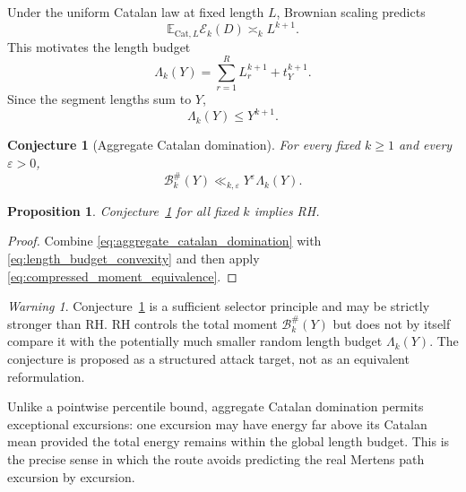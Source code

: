 \documentclass[11pt]{amsart}
\numberwithin{equation}{section}
\theoremstyle{plain}
\newtheorem{proposition}[theorem]{Proposition}
\newtheorem{conjecture}[theorem]{Conjecture}
\theoremstyle{definition}
\theoremstyle{remark}
\newtheorem{warning}[theorem]{Warning}
\newcommand{\E}{\mathbb{E}}
\newcommand{\eps}{\varepsilon}
\begin{document}
Under the uniform Catalan law at fixed length $L$, Brownian scaling predicts
\begin{equation}
\E_{\mathrm{Cat},L}\mathcal E_k(D)
\asymp_k L^{k+1}.
\label{eq:catalan_integrated_moment_scale}
\end{equation}
This motivates the length budget
\begin{equation}
\Lambda_k(Y)
=
\sum_{r=1}^{R}L_r^{k+1}+t_Y^{k+1}.
\label{eq:length_moment_budget}
\end{equation}
Since the segment lengths sum to $Y$,
\begin{equation}
\Lambda_k(Y)\leq Y^{k+1}.
\label{eq:length_budget_convexity}
\end{equation}

\begin{conjecture}[Aggregate Catalan domination]
\label{conj:aggregate_catalan_domination}
For every fixed $k\geq1$ and every $\eps>0$,
\begin{equation}
\mathcal B_k^{\#}(Y)
\ll_{k,\eps}
Y^{\eps}\Lambda_k(Y).
\label{eq:aggregate_catalan_domination}
\end{equation}
\end{conjecture}

\begin{proposition}
\label{prop:aggregate_catalan_domination_implies_rh}
Conjecture~\ref{conj:aggregate_catalan_domination} for all fixed $k$ implies
RH.
\end{proposition}

\begin{proof}
Combine \eqref{eq:aggregate_catalan_domination} with
\eqref{eq:length_budget_convexity} and then apply
\eqref{eq:compressed_moment_equivalence}.
\end{proof}

\begin{warning}
\label{warn:aggregate_domination_strength}
Conjecture~\ref{conj:aggregate_catalan_domination} is a sufficient selector
principle and may be strictly stronger than RH.  RH controls the total moment
$\mathcal B_k^{\#}(Y)$ but does not by itself compare it with the potentially
much smaller random length budget $\Lambda_k(Y)$.  The conjecture is proposed
as a structured attack target, not as an equivalent reformulation.
\end{warning}

Unlike a pointwise percentile bound, aggregate Catalan domination permits
exceptional excursions: one excursion may have energy far above its Catalan
mean provided the total energy remains within the global length budget.  This
is the precise sense in which the route avoids predicting the real Mertens
path excursion by excursion.
\end{document}

